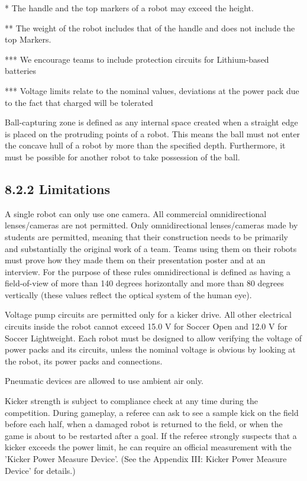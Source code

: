 \documentclass{article}
\begin{document}
* The handle and the top markers of a robot may exceed the height. 

** The weight of the robot includes that of the handle and does not include the top Markers.

*** We encourage teams to include protection circuits for Lithium-based batteries

*** Voltage limits relate to the nominal values, deviations at the power pack due to the fact that charged will be tolerated

Ball-capturing zone is defined as any internal space created when a straight edge is placed on the protruding points of a robot. This means the ball must not enter the concave hull of a robot by more than the specified depth. Furthermore, it must be possible for another robot to take possession of the ball.

\subsection{\textcolor{color-5}{8}.2.2 Limitations\label{ref-056}}

\textcolor{color-5}{A single robot can only use one camera. All commercial omnidirectional lenses/cameras are not permitted. Only omnidirectional lenses/cameras made by students are permitted, meaning that} \textcolor{color-5}{t}\textcolor{color-5}{heir construction needs to be primarily and substantially the original work of a team. Teams using them on their robots must prove how they made them on their presentation poster and at an interview. For the purpose of these rules omnidirectional is defined as having a field-of-view of more than 140 degrees horizontally and more than 80 degrees vertically (these values reflect the optical system of the human eye).}

Voltage pump circuits are permitted only for a kicker drive. All other electrical circuits inside the robot cannot exceed 15.0 V for \textcolor{color-5}{Soccer} Open and 12.0 V for \textcolor{color-5}{Soccer Lightweight}. Each robot must be designed to allow verifying the voltage of power packs and its circuits, unless the nominal voltage is obvious by looking at the robot, its power packs and connections. 

Pneumatic devices are allowed to use ambient air only. 

Kicker strength is subject to compliance check at any time during the competition. During gameplay, a referee can ask to see a sample kick on the field before each half, when a damaged robot is returned to the field, or when the game is about to be restarted after a goal. If the referee strongly suspects that a kicker exceeds the power limit, he can require an official measurement with the 'Kicker Power Measure Device'. (See the Appendix \textcolor{color-5}{III:} Kicker Power Measure Device' for details.) 
\end{document}
